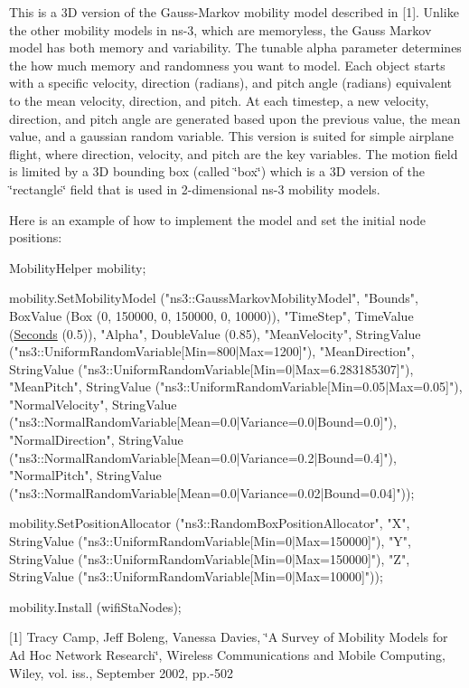 This is a 3D version of the Gauss-\/\+Markov mobility model described in \mbox{[}1\mbox{]}. Unlike the other mobility models in ns-\/3, which are memoryless, the Gauss Markov model has both memory and variability. The tunable alpha parameter determines the how much memory and randomness you want to model. Each object starts with a specific velocity, direction (radians), and pitch angle (radians) equivalent to the mean velocity, direction, and pitch. At each timestep, a new velocity, direction, and pitch angle are generated based upon the previous value, the mean value, and a gaussian random variable. This version is suited for simple airplane flight, where direction, velocity, and pitch are the key variables. The motion field is limited by a 3D bounding box (called \char`\"{}box\char`\"{}) which is a 3D version of the \char`\"{}rectangle\char`\"{} field that is used in 2-\/dimensional ns-\/3 mobility models.

Here is an example of how to implement the model and set the initial node positions\+: 
\begin{DoxyCode}
MobilityHelper mobility;

mobility.SetMobilityModel (\textcolor{stringliteral}{"ns3::GaussMarkovMobilityModel"},
  \textcolor{stringliteral}{"Bounds"}, BoxValue (Box (0, 150000, 0, 150000, 0, 10000)),
  \textcolor{stringliteral}{"TimeStep"}, TimeValue (\hyperlink{group__timecivil_ga33c34b816f8ff6628e33d5c8e9713b9e}{Seconds} (0.5)),
  \textcolor{stringliteral}{"Alpha"}, DoubleValue (0.85),
  \textcolor{stringliteral}{"MeanVelocity"}, StringValue (\textcolor{stringliteral}{"ns3::UniformRandomVariable[Min=800|Max=1200]"}),
  \textcolor{stringliteral}{"MeanDirection"}, StringValue (\textcolor{stringliteral}{"ns3::UniformRandomVariable[Min=0|Max=6.283185307]"}),
  \textcolor{stringliteral}{"MeanPitch"}, StringValue (\textcolor{stringliteral}{"ns3::UniformRandomVariable[Min=0.05|Max=0.05]"}),
  \textcolor{stringliteral}{"NormalVelocity"}, StringValue (\textcolor{stringliteral}{"ns3::NormalRandomVariable[Mean=0.0|Variance=0.0|Bound=0.0]"}),
  \textcolor{stringliteral}{"NormalDirection"}, StringValue (\textcolor{stringliteral}{"ns3::NormalRandomVariable[Mean=0.0|Variance=0.2|Bound=0.4]"}),
  \textcolor{stringliteral}{"NormalPitch"}, StringValue (\textcolor{stringliteral}{"ns3::NormalRandomVariable[Mean=0.0|Variance=0.02|Bound=0.04]"}));

mobility.SetPositionAllocator (\textcolor{stringliteral}{"ns3::RandomBoxPositionAllocator"},
  \textcolor{stringliteral}{"X"}, StringValue (\textcolor{stringliteral}{"ns3::UniformRandomVariable[Min=0|Max=150000]"}),
  \textcolor{stringliteral}{"Y"}, StringValue (\textcolor{stringliteral}{"ns3::UniformRandomVariable[Min=0|Max=150000]"}),
  \textcolor{stringliteral}{"Z"}, StringValue (\textcolor{stringliteral}{"ns3::UniformRandomVariable[Min=0|Max=10000]"}));

mobility.Install (wifiStaNodes);
\end{DoxyCode}
 \mbox{[}1\mbox{]} Tracy Camp, Jeff Boleng, Vanessa Davies, \char`\"{}\+A Survey of Mobility Models
for Ad Hoc Network Research\char`\"{}, Wireless Communications and Mobile Computing, Wiley, vol. iss., September 2002, pp.-\/502 

